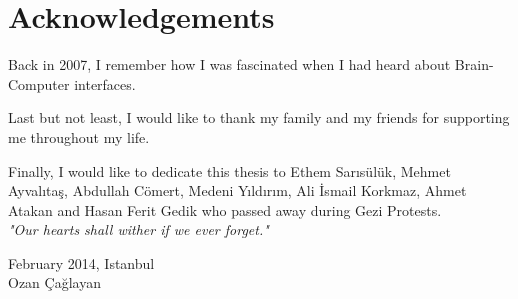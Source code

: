 \documentclass[12pt]{article}
\title{}
\numberwithin{equation}{section}
\numberwithin{figure}{section}
\numberwithin{table}{section}
\begin{document}
%



\clearpage
\vspace*{-0.35cm}
\section*{Acknowledgements}
\vspace*{6pt}
\par{
Back in 2007, I remember how I was fascinated when I had heard about Brain-Computer interfaces.
}
\par{
Last but not least, I would like to thank my family and my friends for supporting me throughout my life.
}
\par{
Finally, I would like to dedicate this thesis to Ethem Sarısülük, Mehmet Ayvalıtaş, Abdullah Cömert, Medeni Yıldırım, Ali İsmail Korkmaz,
Ahmet Atakan and Hasan Ferit Gedik who passed away during Gezi Protests.\\
\emph{"Our hearts shall wither if we ever forget."}
}

\vspace*{2cm}
\begin{flushright}
February 2014, Istanbul \\
Ozan Çağlayan
\end{flushright}
\clearpage

\setcounter{tocdepth}{5}
\renewcommand\contentsname{\normalsize\bfseries Table of Contents}
\thispagestyle{empty}
\vspace*{0.15cm}
\tableofcontents
\clearpage

\renewcommand\nomname{\normalsize\bfseries List of Abbreviations}
\thispagestyle{empty}
\vspace*{0.15cm}
\printnomenclature
\clearpage

\renewcommand\listfigurename{\normalsize\bfseries List of Figures}
\thispagestyle{empty}
\vspace*{0.15cm}
\listoffigures
\clearpage
\end{document}
